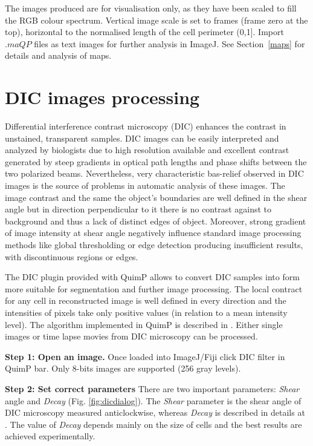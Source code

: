 \documentclass[a4paper,12pt]{article}
\begin{document}
The images produced are for visualisation only, as they have been scaled to fill the RGB colour spectrum.
Vertical image scale is set to frames (frame zero at the top),
horizontal to the normalised length of the cell perimeter (0,1].
Import $.maQP$ files as text images for further analysis in ImageJ. See Section~\ref{maps} for details
and analysis of maps.

\section{DIC images processing}
\label{sec:DIC}

Differential interference contrast microscopy (DIC) enhances the contrast in unstained, transparent samples. DIC images can be easily interpreted and analyzed by biologists due to high resolution available and excellent contrast generated by steep gradients in optical path lengths and phase shifts between the two polarized beams. Nevertheless, very characteristic bas-relief observed in DIC images is the source of problems in automatic analysis of these images. The image contrast and the same the object’s boundaries are well defined in the shear angle but in direction perpendicular to it there is no contrast against to background and thus a lack of distinct edges of object. Moreover, strong gradient of image intensity at shear angle negatively influence standard image processing methods like global thresholding or edge detection producing insufficient results, with discontinuous regions or edges.

The DIC plugin provided with QuimP allows to convert DIC samples into form more suitable for segmentation and further image processing. The local contract for any cell in reconstructed image is well defined in every direction and the intensities of pixels take only positive values (in relation to a mean intensity level). The algorithm implemented in QuimP is described in \cite{Kam1998}. Either single images or time lapse movies from DIC microscopy can be processed. 

\textbf{Step 1: Open an image.}
Once loaded into ImageJ/Fiji click DIC filter in QuimP bar. Only 8-bits images are supported (256 gray levels).

\textbf{Step 2: Set correct parameters}
There are two important parameters: \textit{Shear} angle and \textit{Decay} (Fig. \ref{fig:dicdialog}). The \textit{Shear} parameter is the shear angle of DIC microscopy measured anticlockwise, whereas \textit{Decay} is described in details at \cite{Kam1998}. The value of \textit{Decay} depends mainly on the size of cells and the best results are achieved experimentally. 
   
\end{document}

